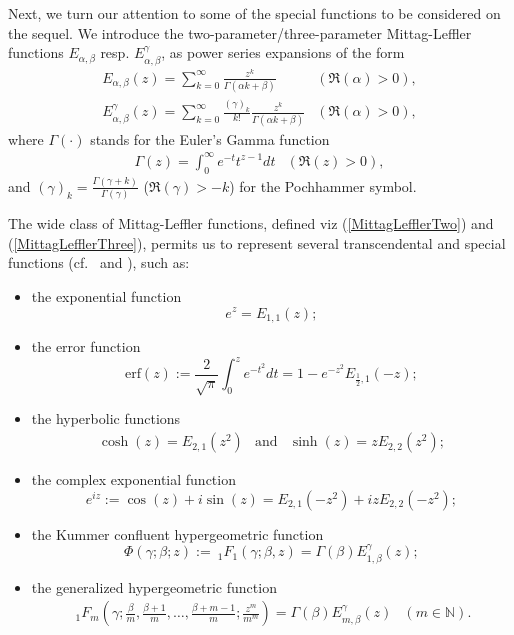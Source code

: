 \documentclass{amsart}
\theoremstyle{definition}
\theoremstyle{remark}
\numberwithin{equation}{section}
\newcommand{\BN}{{\mathbb N}}
\begin{document}
Next, we turn our attention to some of the special functions to be considered on the sequel. 
We introduce the two-parameter/three-parameter Mittag-Leffler functions $E_{\alpha,\beta}$ resp. $E_{\alpha,\beta}^\gamma$, as power series expansions of the form
\begin{eqnarray}
	\label{MittagLefflerTwo}E_{\alpha,\beta}(z)=\displaystyle \sum_{k=0}^{\infty} \frac{z^k}{\Gamma(\alpha k+\beta)} 
	&	(\Re(\alpha)>0),
	\\
	\label{MittagLefflerThree}E_{\alpha,\beta}^\gamma(z)=\displaystyle \sum_{k=0}^{\infty} \frac{(\gamma)_k}{k!}\frac{z^k}{\Gamma(\alpha k+\beta)}
	& (\Re(\alpha)>0),
\end{eqnarray}
where $\Gamma(\cdot)$ stands for the Euler's Gamma function
\begin{eqnarray}
	\label{GammaFunction} \Gamma(z)=\int_0^\infty e^{-t} t^{z-1}dt &(\Re(z)>0),
\end{eqnarray}
and $\displaystyle (\gamma)_k=\frac{\Gamma(\gamma+k)}{\Gamma(\gamma)}$ ($\Re(\gamma)>-k$) for the Pochhammer symbol.

The wide class of Mittag-Leffler functions, defined viz (\ref{MittagLefflerTwo}) and (\ref{MittagLefflerThree}), permits us to represent several transcendental and special functions (cf.~\cite[Subsection 1.8 \& Subsection 1.9]{KST06} and \cite[Chapter 3 -Chapter 5]{GKMaiR14}), such as:
\begin{itemize}
	\item[\bf (i)] the exponential function $$e^z=E_{1,1}(z);$$
	\item[\bf (ii)] the error function $$\displaystyle \mbox{erf}(z):=\frac{2}{\sqrt{\pi}}\int_0^z e^{-t^2}dt=1-e^{-z^2}E_{\frac{1}{2},1}(-z);$$
	\item[\bf (iii)] the hyperbolic functions
	\begin{eqnarray*}
		\cosh(z)=E_{2,1}(z^2) &\mbox{and} &\sinh(z)=zE_{2,2}(z^2);
	\end{eqnarray*}
	\item[\bf (iv)] the complex exponential function $$e^{iz}:=\cos(z)+i\sin(z)=E_{2,1}(-z^2)+izE_{2,2}(-z^2);$$
	\item[\bf (v)] the Kummer confluent hypergeometric function
	$$ \varPhi(\gamma;\beta;z):={~}_1F_1(\gamma;\beta,z) =\Gamma(\beta)E_{1,\beta}^\gamma(z);$$
	\item[\bf (vi)] the generalized hypergeometric function
	\begin{eqnarray*}
		{~}_1F_m\left(\gamma;\frac{\beta}{m},\frac{\beta+1}{m},\ldots,\frac{\beta+m-1}{m};\frac{z^m}{m^m}\right) =\Gamma(\beta)E_{m,\beta}^\gamma(z) &(m\in \BN).
	\end{eqnarray*}
\end{itemize}
\end{document}

